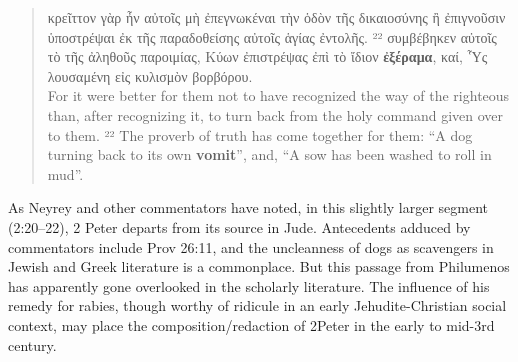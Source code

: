 \vspace*{1mm} 
 \begin{quote}κρεῖττον γὰρ ἦν αὐτοῖς
 μὴ ἐπεγνωκέναι τὴν ὁδὸν τῆς δικαιοσύνης ἢ ἐπιγνοῦσιν
 ὑποστρέψαι ἐκ τῆς παραδοθείσης αὐτοῖς ἁγίας ἐντολῆς.
 ²²  συμβέβηκεν αὐτοῖς τὸ τῆς ἀληθοῦς παροιμίας,
  Κύων ἐπιστρέψας ἐπὶ τὸ ἴδιον \textbf{ἐξέραμα},
 καί, Ὗς λουσαμένη εἰς κυλισμὸν βορβόρου. \\[1mm] %
 For it were better for them not to have recognized the way of the righteous than, %
 after recognizing it, to turn back from the holy command given over to them. %
 ²² The proverb of truth has come together for them: %
 “A dog turning back to its own \textbf{vomit}”, %
 and, “A sow has been washed to roll in mud”. %
 \end{quote} %
 \vspace*{3mm}

As Neyrey and other commentators have noted, %
in this slightly larger segment (2:20--22), 2 Peter departs from its source in Jude. %
Antecedents adduced by commentators include Prov 26:11, %
and the uncleanness of dogs as scavengers in Jewish and Greek literature is a commonplace. But this passage from Philumenos has apparently gone overlooked in the scholarly literature. %
The influence of his remedy for rabies, %
though worthy of ridicule in an early Jehudite-Christian social context, %
may place the composition/redaction of 2Peter in the early to mid-3rd century. %


